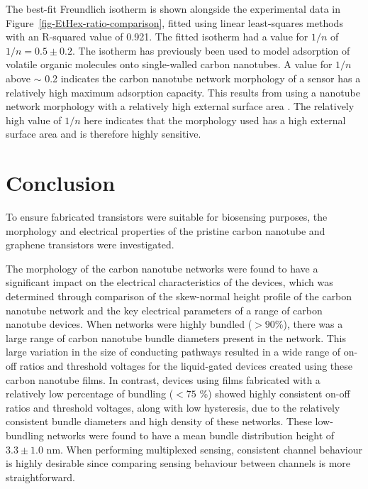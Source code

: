 \documentclass[
  a4paper,
]{scrbook}
\begin{document}
The best-fit Freundlich isotherm is shown alongside the experimental
data in Figure~\ref{fig-EtHex-ratio-comparison}, fitted using linear
least-squares methods with an R-squared value of 0.921. The fitted
isotherm had a value for \(1/n\) of \(1/n = 0.5\pm0.2\). The isotherm
has previously been used to model adsorption of volatile organic
molecules onto single-walled carbon nanotubes. A value for \(1/n\) above
\(\sim\) 0.2 indicates the carbon nanotube network morphology of a
sensor has a relatively high maximum adsorption capacity. This results
from using a nanotube network morphology with a relatively high external
surface area \autocite{Agnihotri2005}. The relatively high value of
\(1/n\) here indicates that the morphology used has a high external
surface area and is therefore highly sensitive.

\hypertarget{conclusion}{%
\section{Conclusion}\label{conclusion}}

To ensure fabricated transistors were suitable for biosensing purposes,
the morphology and electrical properties of the pristine carbon nanotube
and graphene transistors were investigated.

The morphology of the carbon nanotube networks were found to have a
significant impact on the electrical characteristics of the devices,
which was determined through comparison of the skew-normal height
profile of the carbon nanotube network and the key electrical parameters
of a range of carbon nanotube devices. When networks were highly bundled
(\(>90\)\%), there was a large range of carbon nanotube bundle diameters
present in the network. This large variation in the size of conducting
pathways resulted in a wide range of on-off ratios and threshold
voltages for the liquid-gated devices created using these carbon
nanotube films. In contrast, devices using films fabricated with a
relatively low percentage of bundling (\(<75\) \%) showed highly
consistent on-off ratios and threshold voltages, along with low
hysteresis, due to the relatively consistent bundle diameters and high
density of these networks. These low-bundling networks were found to
have a mean bundle distribution height of \(3.3 \pm 1.0\) nm. When
performing multiplexed sensing, consistent channel behaviour is highly
desirable since comparing sensing behaviour between channels is more
straightforward.
\end{document}
